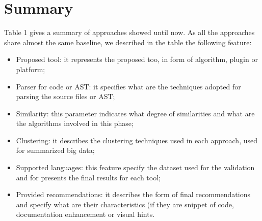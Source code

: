 \section{Summary}
Table 1 gives a summary of approaches showed until now. As all the approaches share almost the same baseline, we described in the table the following feature:
\begin{itemize}
\item Proposed tool: it represents the proposed too, in form of algorithm, plugin or platform;
\item Parser for code or AST: it specifies what are the techniques adopted for parsing the source files or AST;
\item Similarity: this parameter indicates what degree of similarities and what are the algorithms involved in this phase;
\item Clustering: it describes the clustering techniques used in each approach, used for summarized big data;
\item Supported languages: this feature specify the dataset used for the validation and for presents the final results for each tool;
\item Provided recommendations: it describes the form of final recommendations and specify what are their characteristics (if they are snippet of code, documentation enhancement or visual hints. 

\end{itemize} 

